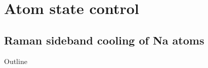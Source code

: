 \documentclass{beamer}
\begin{document}
\section{Atom state control}
\subsection{Raman sideband cooling of Na atoms}
\begin{frame}{Outline}
\end{frame}

\end{document}
